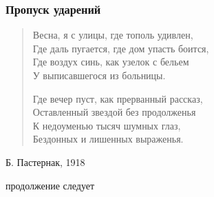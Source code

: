 \documentclass{beamer}
\begin{document}
\begin{frame}
\frametitle{Пропуск ударений}

\begin{verse}
Весна, я с улицы, где тополь удивлен, \\
Где даль пугается, где дом упасть боится,\\ 
Где воздух синь, как узелок с бельем \\
\alert{У выписавшегося из больницы}. 

Где вечер пуст, как прерванный рассказ,\\ 
Оставленный звездой без продолженья \\
К недоуменью тысяч шумных глаз, \\
Бездонных и лишенных выраженья. 
\end{verse}

Б. Пастернак, 1918

\end{frame}




\begin{frame}
\Huge{\centerline{продолжение следует}}
\end{frame}
\end{document}
